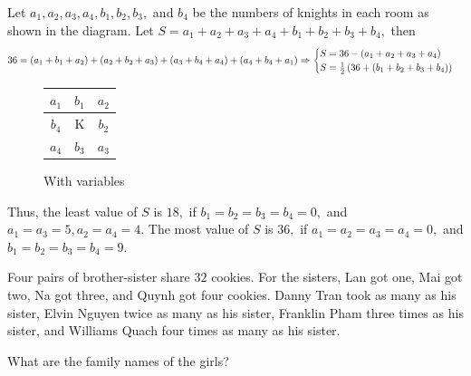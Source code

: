 \documentclass{article}
\begin{document}
\begin{soln}
    Let $a_1,a_2,a_3,a_4,b_1,b_2,b_3,$ and $b_4$ be the numbers of knights in each room as shown in the diagram.
    Let $S=a_1+a_2+a_3+a_4+b_1+b_2+b_3+b_4,$ then
    \[
        36 = (a_1+b_1+a_2)+(a_2+b_2+a_3)+(a_3+b_4+a_4)+(a_4+b_4+a_1)
        \Rightarrow 
        \begin{cases}
            S = 36 - (a_1+a_2+a_3+a_4)\\
            S = \frac{1}{2}\left(36 + (b_1+b_2+b_3+b_4)\right)
        \end{cases}
    \]
    \begin{figure}[h]
        \centering
        \begin{minipage}[t]{6.5cm}
            \centering
            \begin{tabular}{|c|c|c|}
                \hline
                $a_1$ & $b_1$ & $a_2$ \\ \hline
                $b_4$ & K & $b_2$ \\ \hline
                $a_4$ & $b_3$ & $a_3$ \\ \hline
            \end{tabular}
            \caption{With variables}
            \label{fig:hc-2022-1-8-11-2}
        \end{minipage}
    \end{figure}

    Thus, the least value of $S$ is $\boxed{18,}$ if $b_1=b_2=b_3=b_4=0,$ and $a_1=a_3=5,a_2=a_4=4.$
    The most value of $S$ is $\boxed{36,}$ if $a_1=a_2=a_3=a_4=0,$ and $b_1=b_2=b_3=b_4=9.$
\end{soln}

\begin{example*}

    Four pairs of brother-sister share $32$ cookies.
    For the sisters, Lan got one, Mai got two, Na got three, and Quynh got four cookies.
    Danny Tran took as many as his sister, Elvin Nguyen twice as many as his sister,
    Franklin Pham three times as his sister, and Williams Quach four times as many as his sister.

    What are the family names of the girls?
\end{example*}
\end{document}
